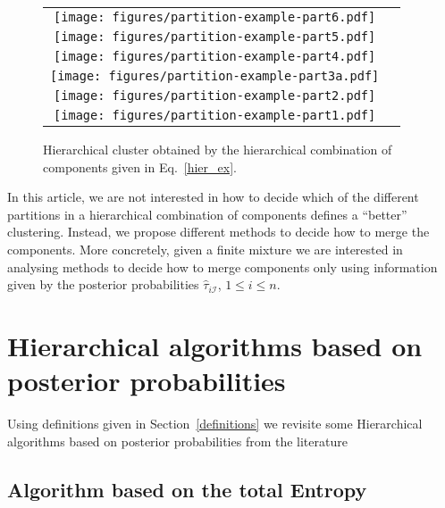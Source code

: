 \documentclass[10pt, a4paper]{article}
\begin{document}
\begin{figure}[thbp]
\begin{center}
\begin{tabular}{cc}
  \texttt{[image: figures/partition-example-part6.pdf]} \\
    \texttt{[image: figures/partition-example-part5.pdf]} \\
      \texttt{[image: figures/partition-example-part4.pdf]} \\
        \texttt{[image: figures/partition-example-part3a.pdf]} \\
          \texttt{[image: figures/partition-example-part2.pdf]} \\
            \texttt{[image: figures/partition-example-part1.pdf]}
 \end{tabular}
 \caption{Hierarchical cluster obtained by the hierarchical combination of components given in Eq.~\ref{hier_ex}.}\label{hierarchical}
\end{center}
\end{figure}

In this article, we are not interested in how to decide which of the different partitions in a hierarchical combination of components defines a ``better'' clustering. Instead, we propose different methods to decide how to merge the components. More concretely, given a finite mixture we are interested in analysing methods to decide how to merge components only using information given by the posterior probabilities $\hat{\tau}_{i \mathcal{I}}$, $1\leq i \leq n$.


\section{Hierarchical algorithms based on posterior probabilities}

Using definitions given in Section~\ref{definitions} we revisite some Hierarchical algorithms based on posterior probabilities from the literature

\subsection*{Algorithm based on the total Entropy}

\end{document}
